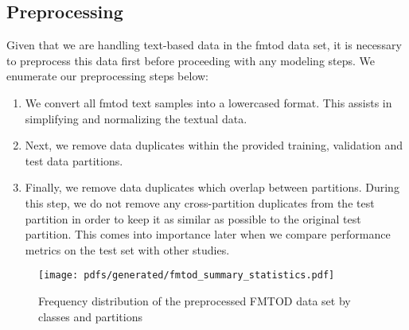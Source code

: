 \subsection{Preprocessing}

Given that we are handling text-based data in the \ac{fmtod} data set, it is
necessary to preprocess this data first before proceeding with any modeling
steps. We enumerate our preprocessing steps below:

\begin{enumerate}{}
  \item We convert all \ac{fmtod} text samples into a lowercased format. This assists
  in simplifying and normalizing the textual data.
  \item Next, we remove data duplicates within the provided training, validation and test
  data partitions.
  \item Finally, we remove data duplicates which overlap between partitions.
  During this step, we do not remove any cross-partition duplicates from the
  test partition in order to keep it as similar as possible to the original test
  partition. This comes into importance later when we compare performance metrics
  on the test set with other studies.
\end{enumerate}

\begin{figure}[t!]
  \centering
  \texttt{[image: pdfs/generated/fmtod\_summary\_statistics.pdf]}
  \caption{Frequency distribution of the preprocessed FMTOD data set by
    classes and partitions}
  \label{fig:fmtod}
\end{figure}

